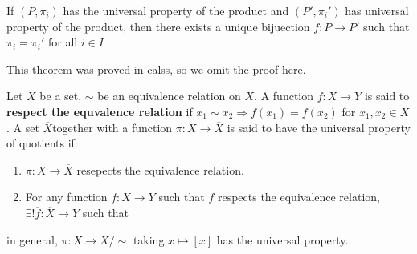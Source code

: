 \documentclass[12pt, twosided]{article}
\begin{document}
\begin{thm}
  If \((P, \pi_i)\) has the universal property of the product and \((P\prime, \pi_i\prime)\) has universal property of the product, then there exists a unique bijuection \(f: P \to P\prime\) such that \(\pi_i = \pi_i\prime\) for all \(i \in I\)

  \begin{center}
  \end{center}
\end{thm}

This theorem was proved in calss, so we omit the proof here.

\begin{df}
  Let \(X\) be a set, \(\sim\) be an equivalence relation on \(X\). A function \(f: X \to Y\) is said to \textbf{respect the equvalence relation} if \(x_1 \sim x_2 \Rightarrow f(x_1) = f(x_2)\)  for \(x_1, x_2 \in X\). A set \(\overline{X}\)together with a function \(\pi: X \to \overline{X}\) is said to have the universal property of quotients if:
  \begin{enumerate}
  \item \(\pi: X \to \overline{X}\) resepects the equivalence relation.
  \item For any function \(f: X \to Y\) such that \(f\) respects the equivalence relation, \(\exists! \overline{f}:\overline{X} \to Y\) such that

    \begin{center}
    \end{center}
  \end{enumerate}
\end{df}

\begin{exa}
  in general, \(\pi: X \to X/\sim\) taking \(x \mapsto [x]\) has the universal property.
\end{exa}
\end{document}
